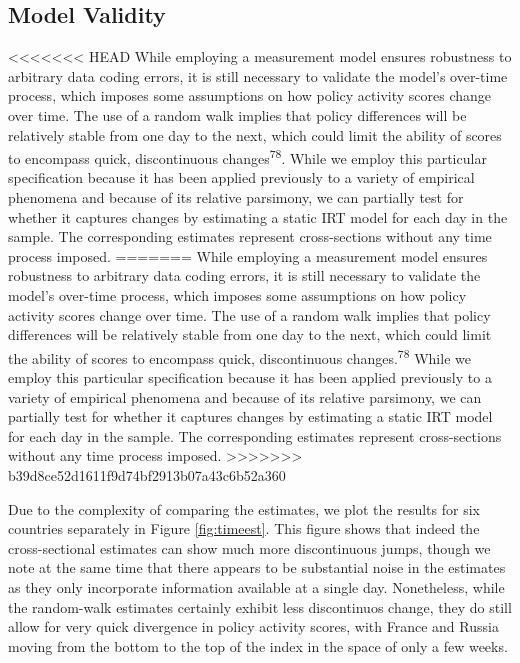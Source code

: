 \documentclass[]{article}
\begin{document}
\hypertarget{model-validity}{%
\subsection*{Model Validity}\label{model-validity}}

<<<<<<< HEAD
While employing a measurement model ensures robustness to arbitrary data coding errors, it is still necessary to validate the model's over-time process, which imposes some assumptions on how policy activity scores change over time. The use of a random walk implies that policy differences will be relatively stable from one day to the next, which could limit the ability of scores to encompass quick, discontinuous changes\textsuperscript{78}. While we employ this particular specification because it has been applied previously to a variety of empirical phenomena and because of its relative parsimony, we can partially test for whether it captures changes by estimating a static IRT model for each day in the sample. The corresponding estimates represent cross-sections without any time process imposed.
=======
While employing a measurement model ensures robustness to arbitrary data coding errors, it is still necessary to validate the model's over-time process, which imposes some assumptions on how policy activity scores change over time. The use of a random walk implies that policy differences will be relatively stable from one day to the next, which could limit the ability of scores to encompass quick, discontinuous changes.\textsuperscript{78} While we employ this particular specification because it has been applied previously to a variety of empirical phenomena and because of its relative parsimony, we can partially test for whether it captures changes by estimating a static IRT model for each day in the sample. The corresponding estimates represent cross-sections without any time process imposed.
>>>>>>> b39d8ce52d1611f9d74bf2913b07a43c6b52a360

Due to the complexity of comparing the estimates, we plot the results for six countries separately in Figure \ref{fig:timeest}. This figure shows that indeed the cross-sectional estimates can show much more discontinuous jumps, though we note at the same time that there appears to be substantial noise in the estimates as they only incorporate information available at a single day. Nonetheless, while the random-walk estimates certainly exhibit less discontinuos change, they do still allow for very quick divergence in policy activity scores, with France and Russia moving from the bottom to the top of the index in the space of only a few weeks.
\end{document}
